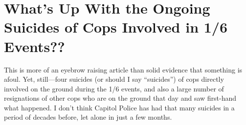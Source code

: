 \chapter{What's Up With the Ongoing Suicides of Cops Involved in 1/6 Events??}

\begin{refsection}

This is more of an eyebrow raising article than solid evidence that something is afoul. Yet, still---four suicides (or should I say \enquote{suicides}) of cops directly involved on the ground during the 1/6 events, and also a large number of resignations of other cops who are on the ground that day and saw first-hand what happened. I don't think Capitol Police has had that many suicides in a period of decades before, let alone in just a few months.

\printbibliography[heading=subbibliography]

\end{refsection}